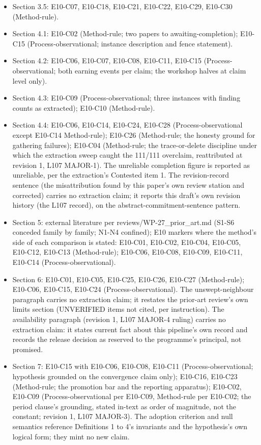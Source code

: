 \documentclass[
  11pt,
]{article}
\begin{document}
\begin{itemize}
  revision 1, L107 MINOR-5).
\item
  Section 3.5: E10-C07, E10-C18, E10-C21, E10-C22, E10-C29, E10-C30
  (Method-rule).
\item
  Section 4.1: E10-C02 (Method-rule; two papers to awaiting-completion);
  E10-C15 (Process-observational; instance description and fence
  statement).
\item
  Section 4.2: E10-C06, E10-C07, E10-C08, E10-C11, E10-C15
  (Process-observational; both earning events per claim; the workshop
  halves at claim level only).
\item
  Section 4.3: E10-C09 (Process-observational; three instances with
  finding counts as extracted); E10-C10 (Method-rule).
\item
  Section 4.4: E10-C06, E10-C14, E10-C24, E10-C28 (Process-observational
  except E10-C14 Method-rule); E10-C26 (Method-rule; the honesty ground
  for gathering failures); E10-C04 (Method-rule; the trace-or-delete
  discipline under which the extraction sweep caught the 111/111
  overclaim, reattributed at revision 1, L107 MAJOR-1). The unreliable
  completion figure is reported as unreliable, per the extraction's
  Contested item 1. The revision-record sentence (the misattribution
  found by this paper's own review station and corrected) carries no
  extraction claim; it reports this draft's own revision history (the
  L107 record), on the abstract-commitment-sentence pattern.
\item
  Section 5: external literature per reviews/WP-27\_prior\_art.md (S1-S6
  conceded family by family; N1-N4 confined); E10 markers where the
  method's side of each comparison is stated: E10-C01, E10-C02, E10-C04,
  E10-C05, E10-C12, E10-C13 (Method-rule); E10-C06, E10-C08, E10-C09,
  E10-C11, E10-C14 (Process-observational).
\item
  Section 6: E10-C01, E10-C05, E10-C25, E10-C26, E10-C27 (Method-rule);
  E10-C06, E10-C15, E10-C24 (Process-observational). The
  unswept-neighbour paragraph carries no extraction claim; it restates
  the prior-art review's own limits section (UNVERIFIED items not cited,
  per instruction). The availability paragraph (revision 1, L107 MAJOR-4
  ruling) carries no extraction claim: it states current fact about this
  pipeline's own record and records the release decision as reserved to
  the programme's principal, not promised.
\item
  Section 7: E10-C15 with E10-C06, E10-C08, E10-C11
  (Process-observational; hypothesis grounded on the convergence claim
  only); E10-C16, E10-C23 (Method-rule; the promotion bar and the
  reporting apparatus); E10-C02, E10-C09 (Process-observational per
  E10-C09, Method-rule per E10-C02; the period clause's grounding,
  stated in-text as order of magnitude, not the constant; revision 1,
  L107 MAJOR-3). The adoption criterion and null semantics reference
  Definitions 1 to 4's invariants and the hypothesis's own logical form;
  they mint no new claim.
\end{itemize}
\end{document}
